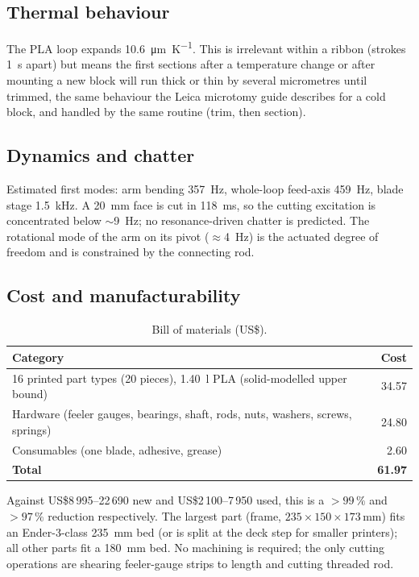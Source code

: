 \documentclass[11pt,a4paper]{article}
\begin{document}
\subsection{Thermal behaviour}
The PLA loop expands \SI{10.6}{\micro\metre\per\kelvin}. This is irrelevant within a ribbon (strokes \SI{1}{\second} apart) but means the first sections after a temperature change or after mounting a new block will run thick or thin by several micrometres until trimmed, the same behaviour the Leica microtomy guide describes for a cold block, and handled by the same routine (trim, then section).

\subsection{Dynamics and chatter}
Estimated first modes: arm bending \SI{357}{\hertz}, whole-loop feed-axis \SI{459}{\hertz}, blade stage \SI{1.5}{\kilo\hertz}. A \SI{20}{\milli\metre} face is cut in \SI{118}{\milli\second}, so the cutting excitation is concentrated below $\sim$\SI{9}{\hertz}; no resonance-driven chatter is predicted. The rotational mode of the arm on its pivot ($\approx$\SI{4}{\hertz}) is the actuated degree of freedom and is constrained by the connecting rod.

\subsection{Cost and manufacturability}
\begin{table}[!htbp]\centering\small
\caption{Bill of materials (US\$).}
\begin{tabular}{@{}lr@{}}
\toprule
Category & Cost \\
\midrule
16 printed part types (20 pieces), \SI{1.40}{\litre} PLA (solid-modelled upper bound) & 34.57 \\
Hardware (feeler gauges, bearings, shaft, rods, nuts, washers, screws, springs) & 24.80 \\
Consumables (one blade, adhesive, grease) & 2.60 \\
\midrule
\textbf{Total} & \textbf{61.97} \\
\bottomrule
\end{tabular}
\end{table}
Against US\$8\,995--22\,690 new and US\$2\,100--7\,950 used, this is a $>99\,\%$ and $>97\,\%$ reduction respectively. The largest part (frame, $235\times150\times173$\,mm) fits an Ender-3-class \SI{235}{\milli\metre} bed (or is split at the deck step for smaller printers); all other parts fit a \SI{180}{\milli\metre} bed. No machining is required; the only cutting operations are shearing feeler-gauge strips to length and cutting threaded rod.
\end{document}
